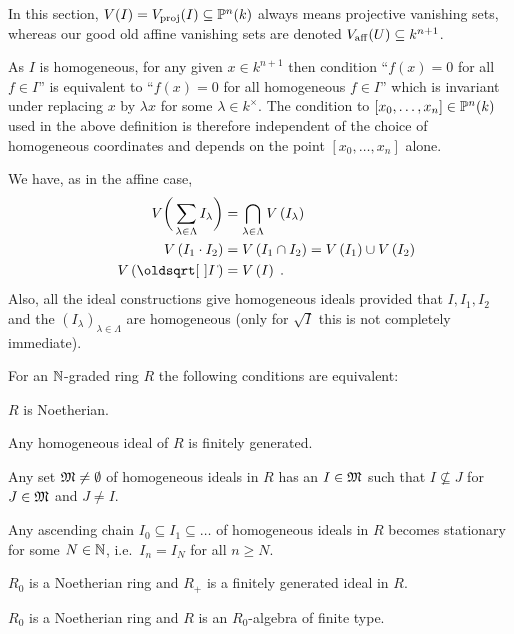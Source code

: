\documentclass[a4paper,parskip=half,numbers=enddot, DIV=12, headheight=30pt]{scrreprt}
\begin{document}
\begin{rem}
    \begin{alphanumerate}
        \item 
            In this section, $V(I) = V_{\mathrm{proj}}(I)\subseteq \mathbb{P}^n(k)$ always means projective vanishing sets, whereas our good old affine vanishing sets are denoted $V_{\mathrm{aff}}(U) \subseteq k^{n+1}$.
        \item 
            As $I$ is homogeneous, for any given $x\in k^{n+1}$ then condition ``$f(x)= 0$ for all $f\in I$''  is equivalent to ``$f(x) = 0$ for all homogeneous $f\in I$'' which is invariant under replacing $x$ by $\lambda x$ for some $\lambda \in k^\times$. The condition to $[x_0,\ldots,x_n]\in \mathbb{P}^n(k)$ used in the above definition is therefore independent of the choice of homogeneous coordinates and depends on the point $[x_0,\ldots, x_n]$ alone.
        \item 
            We have, as in the affine case,
            \begin{align}\lbl{eq:projectiveVanishingOp}
                \begin{split}
                V\bigg(\sum_{\lambda\in \Lambda}I_\lambda\bigg) &= \bigcap_{\lambda\in \Lambda} V\left(I_\lambda\right)\\
                \quad V\left(I_1\cdot I_2\right) &= V\left(I_1\cap I_2\right) = V\left(I_1\right)\cup V\left(I_2\right)\\
                \quad V\left(\sqrt{I}\right)&= V\left(I\right)\;.
                \end{split}
            \end{align}
            Also, all the ideal constructions give homogeneous ideals provided that $I,I_1,I_2$ and the $(I_\lambda)_{\lambda\in\Lambda}$ are homogeneous (only for $\sqrt{I}$ this is not completely immediate).
    \end{alphanumerate}
\end{rem}

\begin{prop}
    For an $\mathbb{N}$-graded ring $R$ the following conditions are equivalent:
    \begin{alphanumerate}
        \item 
            $R$ is Noetherian.
        \item 
            Any homogeneous ideal of $R$ is finitely generated.
        \item
            Any set $\mathfrak{M}\neq \emptyset$ of homogeneous ideals in $R$ has an $I\in \mathfrak{M}$ such that $I\not\subseteq J$ for $J\in \mathfrak{M}$ and $J\neq I$.
        \item 
            Any ascending chain $I_0\subseteq I_1\subseteq \ldots$ of homogeneous ideals in $R$ becomes stationary for some $N\in\mathbb{N}$, i.e.\ $I_n = I_N$ for all $n\geq N$.
        \item 
            $R_0$ is a Noetherian ring and $R_+$ is a finitely generated ideal in $R$.
        \item 
            $R_0$ is a Noetherian ring and $R$ is an $R_0$-algebra of finite type.
    \end{alphanumerate}
\end{prop}
\end{document}
